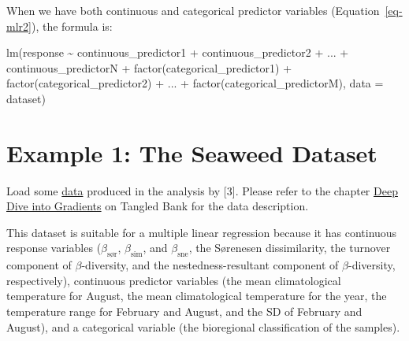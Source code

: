 \documentclass[
  letterpaper,
]{book}
\newenvironment{Shaded}{\begin{snugshade}}{\end{snugshade}}
\newcommand{\AttributeTok}[1]{\textcolor[rgb]{0.40,0.45,0.13}{#1}}
\newcommand{\FunctionTok}[1]{\textcolor[rgb]{0.28,0.35,0.67}{#1}}
\newcommand{\NormalTok}[1]{\textcolor[rgb]{0.00,0.23,0.31}{#1}}
\newcommand{\SpecialCharTok}[1]{\textcolor[rgb]{0.37,0.37,0.37}{#1}}
\begin{document}
When we have both continuous and categorical predictor variables
(Equation~\ref{eq-mlr2}), the formula is:

\begin{Shaded}
\begin{Highlighting}[]
\FunctionTok{lm}\NormalTok{(response }\SpecialCharTok{\textasciitilde{}}\NormalTok{ continuous\_predictor1 }\SpecialCharTok{+}\NormalTok{ continuous\_predictor2 }\SpecialCharTok{+}\NormalTok{ ...}
   \SpecialCharTok{+}\NormalTok{ continuous\_predictorN }\SpecialCharTok{+} \FunctionTok{factor}\NormalTok{(categorical\_predictor1) }\SpecialCharTok{+}
     \FunctionTok{factor}\NormalTok{(categorical\_predictor2) }\SpecialCharTok{+}\NormalTok{ ...}
   \SpecialCharTok{+} \FunctionTok{factor}\NormalTok{(categorical\_predictorM),}
   \AttributeTok{data =}\NormalTok{ dataset)}
\end{Highlighting}
\end{Shaded}

\section{Example 1: The Seaweed Dataset}\label{sec-example1}

Load some
\href{https://tangledbank.netlify.app/data/seaweed/spp_df2.csv}{data}
produced in the analysis by {[}3{]}. Please refer to the chapter
\href{https://tangledbank.netlify.app/BCB743/06-deep_dive.html}{Deep
Dive into Gradients} on Tangled Bank for the data description.

This dataset is suitable for a multiple linear regression because it has
continuous response variables (\(\beta_\text{sør}\),
\(\beta_\text{sim}\), and \(\beta_\text{sne}\), the Sørenesen
dissimilarity, the turnover component of \(\beta\)-diversity, and the
nestedness-resultant component of \(\beta\)-diversity, respectively),
continuous predictor variables (the mean climatological temperature for
August, the mean climatological temperature for the year, the
temperature range for February and August, and the SD of February and
August), and a categorical variable (the bioregional classification of
the samples).
\end{document}
